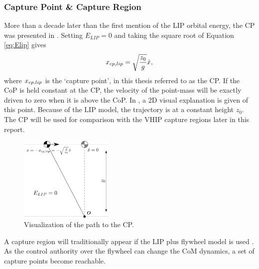 \subsubsection{Capture Point \& Capture Region} 
More than a decade later than the first mention of the \ac{LIP} orbital energy, the \ac{CP} was presented in  \cite{pratt2006capture}. Setting $E_{LIP}=0$ and taking the square root of Equation \eqref{eq:Elip} gives
\begin{equation}
x_{cp,lip}=\sqrt{ \frac{z_0}{g}}\dot{x} ,
\label{eq:cp}
\end{equation}
where $x_{cp,lip}$ is the `capture point', in this thesis referred to as the \ac{CP}. If the \ac{CoP} is held constant at the \ac{CP}, the velocity of the point-mass will be exactly driven to zero when it is above the \ac{CoP}. In , a \ac{2D} visual explanation is given of this point. Because of the \ac{LIP} model, the trajectory is at a constant height $z_0$. The \ac{CP} will be used for comparison with the \ac{VHIP} capture regions later in this report.
\begin{figure}
\centering
\includegraphics[width=0.4\textwidth]{STYLESTUFF/2DCP.png}
\caption{Visualization of the path to the \ac{CP}. }
\label{fig:2dicp}
\end{figure}

A capture region will traditionally appear if the \ac{LIP} plus flywheel model is used \cite{pratt2006capture, stephens2007humanoid, koolen2012capturability}. As the control authority over the flywheel can change the \ac{CoM} dynamics, a set of capture points become reachable.

